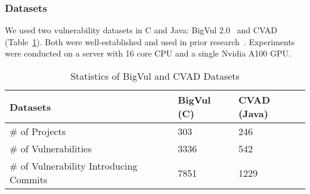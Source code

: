 \subsubsection{\textbf{Datasets}}\label{dataset}

We used two vulnerability datasets in C and Java: BigVul
2.0~\cite{bigvul-msr20} and CVAD~\cite{deepCVA-ase21}
(Table~\ref{dataset:tab}).
Both were well-established and used in prior
research~\cite{bigvul-msr20,li2021vulnerability,deepCVA-ase21}. Experiments were
conducted on a server with 16 core CPU and a single Nvidia A100 GPU.




\begin{table}[t]
	\caption{Statistics of BigVul and CVAD Datasets}
        \tabcolsep 2.5pt
        \vspace{-10pt}
	\begin{center}
\small
		\renewcommand{\arraystretch}{1}
		\begin{tabular}{l|p{1.5cm}<{\centering}|p{2cm}<{\centering}}
			
        	Datasets	& BigVul (C) & CVAD (Java)\\\hline
		\# of Projects  & 303 & 246 \\\hline
	    \# of Vulnerabilities & 3336 & 542\\\hline
     	\# of Vulnerability Introducing Commits & 7851 & 1229\\\hline

		\end{tabular}
		\label{dataset:tab}
	\end{center}
\end{table}





